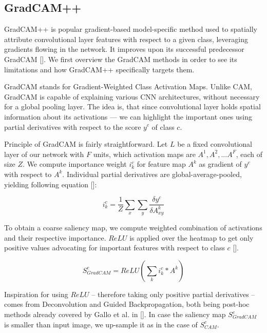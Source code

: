 \subsection{GradCAM++}

GradCAM++ is popular gradient-based model-specific method used to spatially attribute convolutional layer features with respect to a given class, leveraging gradients flowing in the network. It improves upon its successful predecessor GradCAM []. We first overview the GradCAM methods in order to see its limitations and how GradCAM++ specifically targets them.\newline


\noindent
GradCAM stands for Gradient-Weighted Class Activation Maps. Unlike CAM, GradCAM is capable of explaining various CNN architectures, without necessary for a global pooling layer. The idea is, that since convolutional layer holds spatial information about its activations --- we can highlight the important ones using partial derivatives with respect to the score $y^c$ of class $c$.

Principle of GradCAM is fairly straightforward. Let $L$ be a fixed convolutional layer of our network with $F$ units, which activation maps are $A^1, A^2, ... A^F$, each of size $Z$. We compute importance weight $i^c_k$ for feature map $A^k$ as gradient of $y^c$ with respect to $A^k$. Individual partial derivatives are global-average-pooled, yielding following equation []:

\begin{equation}
    i^c_k = \frac{1}{Z} \sum_x \sum_y \frac{\delta y^c}{\delta A^k_{xy}}
\end{equation}

To obtain a coarse saliency map, we compute weighted combination of activations and their respective importance. $ReLU$ is applied over the heatmap to get only positive values advocating for important features with respect to class $c$ [].

\begin{equation}
    S^c_{GradCAM} = ReLU(\sum_k i^c_k * A^k)
\end{equation}

Inspiration for using $ReLU$ -- therefore taking only positive partial derivatives -- comes from Deconvolution and Guided Backpropagation, both being post-hoc methods already covered by Gallo et al. in []. In case the saliency map $S^c_{GradCAM}$ is smaller than input image, we up-sample it as in the case of $S^c_{CAM}$.\newline


